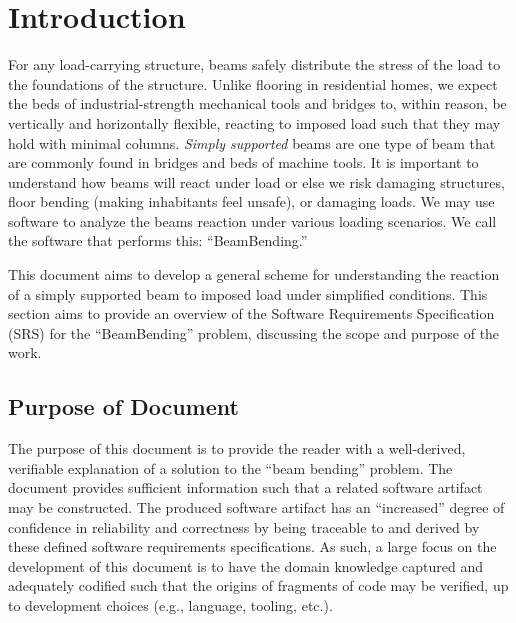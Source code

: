 \documentclass[12pt]{article}
\begin{document}


\section{Introduction}

For any load-carrying structure, beams safely distribute the stress of the load
to the foundations of the structure. Unlike flooring in residential homes, we
expect the beds of industrial-strength mechanical tools and bridges to, within
reason, be vertically and horizontally flexible, reacting to imposed load such
that they may hold with minimal columns. \textit{Simply supported} beams are one
type of beam that are commonly found in bridges and beds of machine tools. It is
important to understand how beams will react under load or else we risk damaging
structures, floor bending (making inhabitants feel unsafe), or damaging loads.
We may use software to analyze the beams reaction under various loading
scenarios. We call the software that performs this: ``BeamBending.''

This document aims to develop a general scheme for understanding the reaction of
a simply supported beam to imposed load under simplified conditions. This
section aims to provide an overview of the Software Requirements Specification
(SRS) for the ``BeamBending'' problem, discussing the scope and purpose of the
work.

\subsection{Purpose of Document}

The purpose of this document is to provide the reader with a well-derived,
verifiable explanation of a solution to the ``beam bending'' problem. The
document provides sufficient information such that a related software artifact
may be constructed. The produced software artifact has an ``increased'' degree
of confidence in reliability and correctness by being traceable to and derived
by these defined software requirements specifications. As such, a large focus on
the development of this document is to have the domain knowledge captured and
adequately codified such that the origins of fragments of code may be verified,
up to development choices (e.g., language, tooling, etc.).
\end{document}

